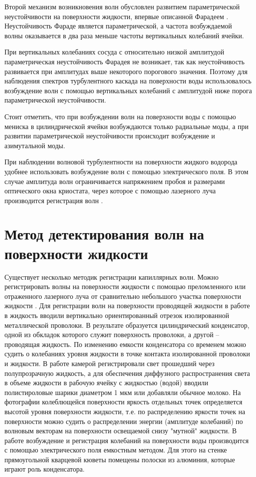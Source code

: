 Второй механизм возникновения волн обусловлен развитием параметрической неустойчивости на поверхности жидкости, впервые описанной Фарадеем \cite{Faraday1831}. Неустойчивость Фараде является параметрической, а частота возбуждаемой волны оказывается в два раза меньше частоты вертикальных колебаний ячейки. 

При вертикальных колебаниях сосуда с относительно низкой амплитудой параметрическая неустойчивость Фарадея не возникает, так как неустойчивость развивается при амплитудах выше некоторого порогового значения. Поэтому для наблюдения спектров турбулентного каскада на поверхности воды использовалось возбуждение волн с помощью вертикальных колебаний с амплитудой ниже порога параметрической неустойчивости. 

Стоит отметить, что при возбуждении волн на поверхности воды с помощью мениска в цилиндрической ячейки возбуждаются только радиальные моды, а при развитии параметрической неустойчивости происходит возбуждение и азимутальной моды.



При наблюдении волновой турбулентности на поверхности жидкого водорода удобнее использовать возбуждение волн с помощью электрического поля. В этом случае амплитуда волн ограничивается напряжением пробоя и размерами оптического окна криостата, через которое с помощью лазерного луча производится регистрация волн \cite{Brazhnikov2002}.


\section{Метод детектирования волн на поверхности жидкости}\label{p1_methodDetect}

Существует несколько методик регистрации капиллярных волн. Можно регистрировать волны на поверхности жидкости с помощью преломленного или отраженного лазерного луча от сравнительно небольшого участка поверхности жидкости \cite{Brazhnikov_IET}. Для регистрации волн на поверхности проводящей жидкости в работе \cite{Falcon2007} в жидкость вводили вертикально ориентированный отрезок изолированной металлической проволоки. В результате образуется цилиндрический конденсатор, одной из обкладок которого служит поверхность проволоки, а другой – проводящая жидкость. По изменению емкости конденсатора со временем можно судить о колебаниях уровня жидкости в точке контакта изолированной проволоки и жидкости.
В работе \cite{Wright1996, Henry2000} камерой регистрировали свет прошедший через полупрозрачную жидкость, а для обеспечения диффузного распространения света в объеме жидкости в рабочую ячейку с жидкостью (водой) вводили полистироловые шарики диаметром 1 мкм или добавляли обычное молоко. На фотографии колеблющейся поверхности яркость отдельных точек определяется высотой уровня поверхности жидкости, т.е. по распределению яркости точек на поверхности можно судить о распределении энергии (амплитуде колебаний) по волновым векторам на поверхности освещаемой снизу "мутной"  жидкости. В работе \cite{Fujimura2008} возбуждение и регистрация колебаний на поверхности воды производится с помощью электрического поля емкостным методом. Для этого на стенке прямоугольной кварцевой кюветы помещены полоски из алюминия, которые играют роль конденсатора.

